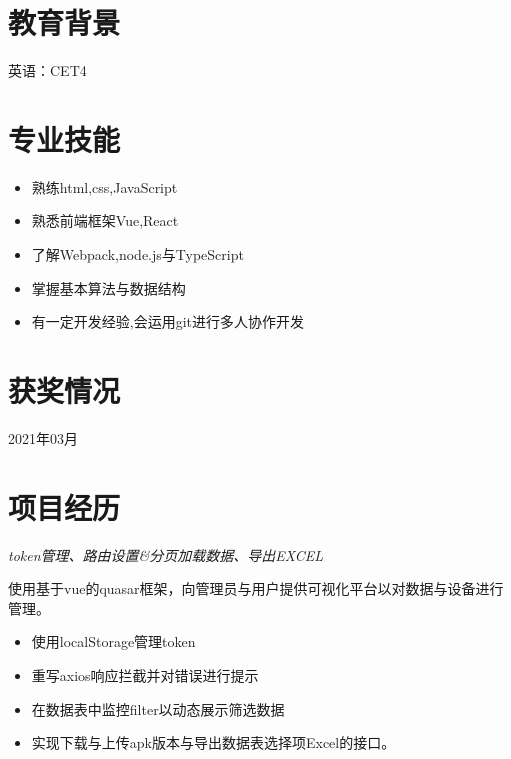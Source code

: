 
\medskip




\section{教育背景}
\quad 英语：CET4



\section{专业技能}
\begin{itemize}
  \item 熟练html,css,JavaScript
  \item 熟悉前端框架Vue,React
  \item 了解Webpack,node.js与TypeScript
  \item 掌握基本算法与数据结构
  \item 有一定开发经验,会运用git进行多人协作开发
\end{itemize}

\section{获奖情况}
 {2021年03月}
\medskip


\section{项目经历}


\textit{token管理、路由设置\&分页加载数据、导出EXCEL}
\vspace{0.4ex}

使用基于vue的quasar框架，向管理员与用户提供可视化平台以对数据与设备进行管理。
\begin{itemize}
  \item 使用localStorage管理token
  \item 重写axios响应拦截并对错误进行提示
  \item 在数据表中监控filter以动态展示筛选数据
  \item 实现下载与上传apk版本与导出数据表选择项Excel的接口。
\end{itemize}


